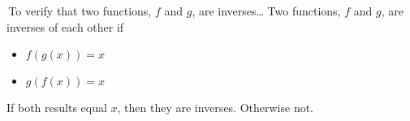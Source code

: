 
\begin{myConcept}{\,To verify that two functions, $f$ and $g$, are inverses\dots}
    Two functions, 
    $f$ and $g$,
    are inverses of each other if
    \vspace{1em}
    {
        \large
        \begin{itemize}[nosep]
            \item $f(g(x)) = x$
            \item $g(f(x)) = x$
        \end{itemize}
    }
    \vspace{1em}
    If both results equal $x$,
    then they are inverses.
    Otherwise not.
\end{myConcept}

